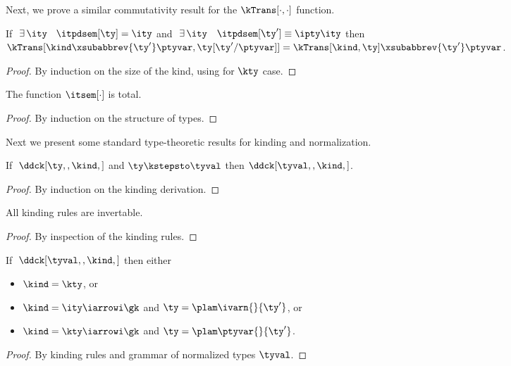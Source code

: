 Next, we prove a similar commutativity result for the $\kTrans[\cdot,\cdot]$ function.
\begin{lemma}
 If $\ \exists\,\ity$ \suchthat\ $\itpdsem[\ty] = \ity$ and
    $\ \exists\,\ity$ \suchthat\ $\itpdsem[\ty'] \equiv {\ipty \ity}$
then  $\kTrans[{\kind\xsubabbrev {\ty'} \ptyvar},{\ty[\ty'/\ptyvar]}] = 
  \kTrans[\kind,\ty]\xsubabbrev {\ty'} \ptyvar$.
\label{lemma:pt-subst-comm}
\end{lemma}

\begin{proof}
  By induction on the size of the kind, using
   for $\kty$ case.
\end{proof}

\begin{lemma}
  The function $\itsem[\cdot]$ is total.
\end{lemma}
\begin{proof}
  By induction on the structure of types.
\end{proof}

Next we present some standard type-theoretic results for \ddc{}
kinding and normalization.

\begin{lemma}
  If $\; \ddck[\ty,,\kind,]$ and $\ty \kstepsto \tyval$ then $\ddck[\tyval,,\kind,]$.
\label{lemma:ddc-preservation}
\end{lemma}
\begin{proof}
  By induction on the kinding derivation.
\end{proof}

\begin{lemma}
  All kinding rules are invertable.
  \label{lemma:inversion}
\end{lemma}
\begin{proof}
  By inspection of the kinding rules.
\end{proof}

\begin{lemma}
  If $\; \ddck[\tyval,,\kind,]$ then either
  \begin{itemize}
  \item $\kind = \kty$, or
  \item $\kind = \ity \iarrowi \gk$ and $\ty = \plam \ivarn {} {\ty'}$, or
  \item $\kind = \kty \iarrowi \gk$ and $\ty = \plam \ptyvar {} {\ty'}$.
  \end{itemize}
\label{lemma:norm-canon-form}
\end{lemma}
\begin{proof}
  By kinding rules and grammar of normalized types $\tyval$.
\end{proof}

